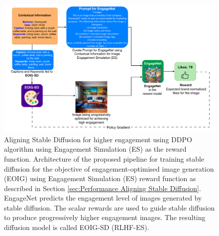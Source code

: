 

\begin{landscape}

\begin{figure}
         \centering
         \includegraphics[width=1.5\textwidth,scale=1]{images/ddpo_bs_reward_compressed.pdf}
         \caption{\label{fig:architecture_diagram_ddpo_bs_reward}
     Aligning Stable Diffusion for higher engagement using DDPO algorithm \cite{black2023training} using Engagement Simulation (ES) as the reward function. Architecture of the proposed pipeline for training stable diffusion for the objective of engagement-optimised image generation (EOIG) using Engagement Simulation (ES) reward function as described in Section \ref{sec:Performance Aligning Stable Diffusion}. 
     EngageNet predicts the engagement level of images generated by stable diffusion. The scalar rewards are used to guide stable diffusion to produce progressively higher engagement images. The resulting diffusion model is called EOIG-SD (RLHF-ES).
     }
\end{figure}



    


\end{landscape}
